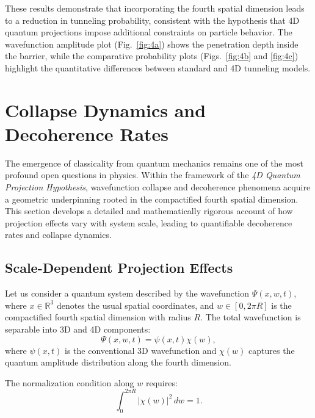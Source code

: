 \documentclass[12pt]{article}
\begin{document}
\vspace{0.3cm}

These results demonstrate that incorporating the fourth spatial dimension leads to a reduction in tunneling probability, consistent with the hypothesis that 4D quantum projections impose additional constraints on particle behavior. The wavefunction amplitude plot (Fig.~\ref{fig:4a}) shows the penetration depth inside the barrier, while the comparative probability plots (Figs.~\ref{fig:4b} and \ref{fig:4c}) highlight the quantitative differences between standard and 4D tunneling models.

\newpage
\section{Collapse Dynamics and Decoherence Rates}

The emergence of classicality from quantum mechanics remains one of the most profound open questions in physics. Within the framework of the \emph{4D Quantum Projection Hypothesis}, wavefunction collapse and decoherence phenomena acquire a geometric underpinning rooted in the compactified fourth spatial dimension. This section develops a detailed and mathematically rigorous account of how projection effects vary with system scale, leading to quantifiable decoherence rates and collapse dynamics.

\subsection{Scale-Dependent Projection Effects}

Let us consider a quantum system described by the wavefunction \(\Psi(x, w, t)\), where \(x \in \mathbb{R}^3\) denotes the usual spatial coordinates, and \(w \in [0, 2\pi R]\) is the compactified fourth spatial dimension with radius \(R\). The total wavefunction is separable into 3D and 4D components:
\begin{equation}
\Psi(x, w, t) = \psi(x, t) \chi(w),
\label{eq:wavefunction_separable}
\end{equation}
where \(\psi(x,t)\) is the conventional 3D wavefunction and \(\chi(w)\) captures the quantum amplitude distribution along the fourth dimension.

The normalization condition along \(w\) requires:
\begin{equation}
\int_0^{2\pi R} |\chi(w)|^2 \, dw = 1.
\label{eq:chi_normalization}
\end{equation}
\end{document}
